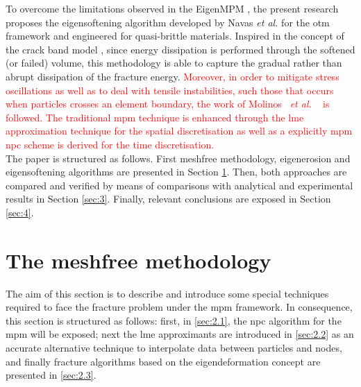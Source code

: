 \documentclass[preprint,12pt,a4paper]{elsarticle}
\newcommand{\etal}{
  \textit{et al.}
}
\newcommand{\PNA}[1]{
  \textcolor{red}{{#1}}
}
\begin{document}
To overcome the limitations observed in the EigenMPM
\cite{Zhang_EE_2020}, the present research proposes the eigensoftening
algorithm developed by Navas {\it et al.}
\cite{Navas_2017_ES,Navas2018a} for the \acrshort{otm} framework and
engineered for quasi-brittle materials. Inspired in the concept of the
crack band model \cite{Bazant83}, since energy dissipation is performed through the softened (or failed) volume, this methodology is able to capture the gradual rather than abrupt
dissipation of the fracture energy. \PNA{Moreover, in order to mitigate stress
oscillations as well as to deal with tensile instabilities, such those that
occurs when particles crosses an element boundary, the work of Molinos~\etal~\cite{Molinos2020} is followed. The traditional \acrshort{mpm} technique is enhanced through the \acrfull{lme} approximation technique
\cite{Arroyo2006} for the spatial discretisation as well as a explicitly \acrshort{mpm} \acrfull{npc} scheme is derived for the time discretisation.}\\

The paper is structured as follows. First meshfree methodology,
eigenerosion and eigensoftening algorithms are presented in Section
\ref{sec:2}. Then, both approaches are compared and verified by means of
comparisons with analytical and experimental results in Section
\ref{sec:3}. Finally, relevant conclusions are exposed in Section \ref{sec:4}.

\section{The meshfree methodology}
\label{sec:2}

The aim of this section is to describe and introduce some special
techniques required to face the fracture problem under the \acrshort{mpm}
framework. In consequence, this section is structured as follows: first, in
\ref{sec:2.1}, the \acrfull{npc} algorithm for the \acrshort{mpm}
will be exposed; next the \acrshort{lme} approximants are
introduced in \ref{sec:2.2} as an accurate alternative technique to
interpolate data between particles and nodes, and finally fracture
algorithms based on the eigendeformation concept are presented in
\ref{sec:2.3}.
\end{document}
